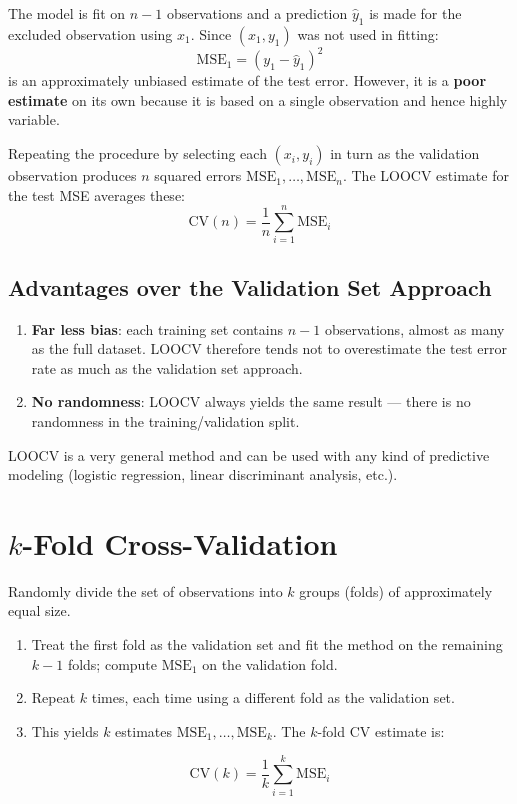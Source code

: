\documentclass[11pt,a4paper]{article}
\theoremstyle{definition}
\theoremstyle{plain}
\theoremstyle{remark}
\begin{document}
The model is fit on $n-1$ observations and a prediction $\hat{y}_1$ is made for the excluded observation using $x_1$. Since $(x_1, y_1)$ was not used in fitting:
\[
    \mathrm{MSE}_1 = (y_1 - \hat{y}_1)^2
\]
is an approximately unbiased estimate of the test error. However, it is a \textbf{poor estimate} on its own because it is based on a single observation and hence highly variable.

Repeating the procedure by selecting each $(x_i, y_i)$ in turn as the validation observation produces $n$ squared errors $\mathrm{MSE}_1, \ldots, \mathrm{MSE}_n$. The LOOCV estimate for the test MSE averages these:
\[
    \mathrm{CV}(n) = \frac{1}{n} \sum_{i=1}^{n} \mathrm{MSE}_i
\]

\subsection{Advantages over the Validation Set Approach}

\begin{enumerate}
    \item \textbf{Far less bias}: each training set contains $n-1$ observations, almost as many as the full dataset. LOOCV therefore tends not to overestimate the test error rate as much as the validation set approach.
    \item \textbf{No randomness}: LOOCV always yields the same result — there is no randomness in the training/validation split.
\end{enumerate}

LOOCV is a very general method and can be used with any kind of predictive modeling (logistic regression, linear discriminant analysis, etc.).

\section{\texorpdfstring{$k$}{k}-Fold Cross-Validation}

\begin{tcolorbox}[colback=blue!5!white,colframe=blue!75!black,title=\textbf{$k$-Fold Cross-Validation}]
Randomly divide the set of observations into $k$ groups (folds) of approximately equal size.
\begin{enumerate}
    \item Treat the first fold as the validation set and fit the method on the remaining $k-1$ folds; compute $\mathrm{MSE}_1$ on the validation fold.
    \item Repeat $k$ times, each time using a different fold as the validation set.
    \item This yields $k$ estimates $\mathrm{MSE}_1, \ldots, \mathrm{MSE}_k$. The $k$-fold CV estimate is:
\end{enumerate}
\[
    \mathrm{CV}(k) = \frac{1}{k} \sum_{i=1}^{k} \mathrm{MSE}_i
\]
\end{tcolorbox}
\end{document}
